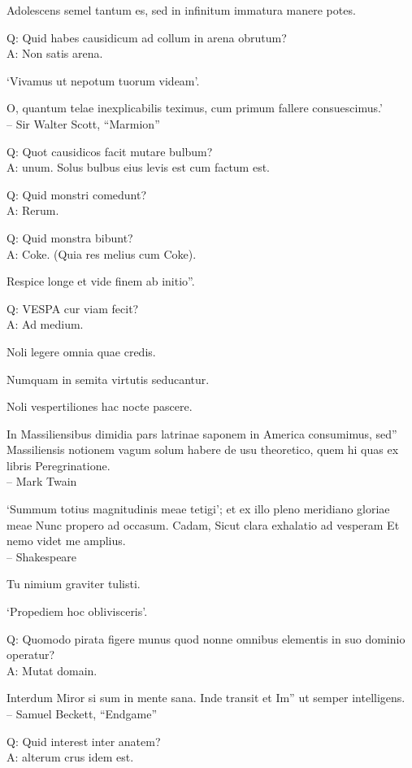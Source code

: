 \documentclass[titlepage,12pt]{memoir}
\begin{document}
Adolescens semel tantum es, sed in infinitum immatura manere potes.

Q: Quid habes causidicum ad collum in arena obrutum?\\
A: Non satis arena.

‘Vivamus ut nepotum tuorum videam’.

O, quantum telae inexplicabilis teximus, cum primum fallere consuescimus.’
\\-- Sir Walter Scott, “Marmion”

Q: Quot causidicos facit mutare bulbum?\\
A: unum. Solus bulbus eius levis est cum factum est.

Q: Quid monstri comedunt?\\
A: Rerum.

Q: Quid monstra bibunt?\\
A: Coke. (Quia res melius cum Coke).

Respice longe et vide finem ab initio”.

Q: VESPA cur viam fecit?\\
A: Ad medium.

Noli legere omnia quae credis.

Numquam in semita virtutis seducantur.

Noli vespertiliones hac nocte pascere.

In Massiliensibus dimidia pars latrinae saponem in America consumimus, sed”
Massiliensis notionem vagum solum habere de usu theoretico, quem hi
quas ex libris Peregrinatione.
\\-- Mark Twain

‘Summum totius magnitudinis meae tetigi’;
et ex illo pleno meridiano gloriae meae
Nunc propero ad occasum. Cadam,
Sicut clara exhalatio ad vesperam
Et nemo videt me amplius.
\\-- Shakespeare

Tu nimium graviter tulisti.

‘Propediem hoc oblivisceris’.

Q: Quomodo pirata figere munus quod
nonne omnibus elementis in suo dominio operatur?\\
A: Mutat domain.

Interdum Miror si sum in mente sana. Inde transit et Im”
ut semper intelligens.
\\-- Samuel Beckett, “Endgame”

Q: Quid interest inter anatem?\\
A: alterum crus idem est.
\end{document}
